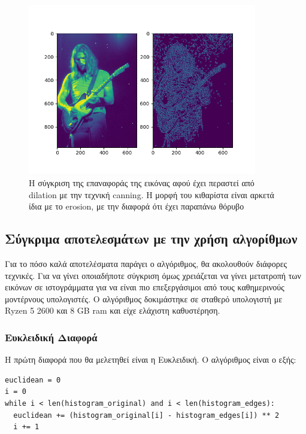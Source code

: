 \begin{figure}[H]
  \centering
  \includegraphics[width=100mm]{Figures/Dilation}
  \caption[Η σύγκριση της επαναφοράς της εικόνας αφού έχει περαστεί απο dilation με την τεχνική canning]{Η σύγκριση της επαναφοράς της εικόνας αφού έχει περαστεί από dilation με την τεχνική canning. Η μορφή του κιθαρίστα είναι αρκετά ίδια με το erosion, με την διαφορά ότι έχει παραπάνω θόρυβο}
  \label{fig:dilation}
\end{figure}

\subsection{Σύγκριμα αποτελεσμάτων με την χρήση αλγορίθμων}

Για το πόσο καλά αποτελέσματα παράγει ο αλγόριθμος, θα ακολουθούν διάφορες τεχνικές. Για να γίνει οποιαδήποτε σύγκριση όμως χρειάζεται να γίνει μετατροπή των εικόνων σε ιστογράμματα για να είναι πιο επεξεργάσιμοι από τους καθημερινούς μοντέρνους υπολογιστές. Ο αλγόριθμος δοκιμάστηκε σε σταθερό υπολογιστή με Ryzen 5 2600 και 8 GB ram και είχε ελάχιστη καθυστέρηση.

\subsubsection{Ευκλειδική Διαφορά}

Η πρώτη διαφορά που θα μελετηθεί είναι η Ευκλειδική. Ο αλγόριθμος είναι ο εξής:

\begin{verbatim}
euclidean = 0
i = 0
while i < len(histogram_original) and i < len(histogram_edges):
  euclidean += (histogram_original[i] - histogram_edges[i]) ** 2
  i += 1
\end{verbatim}

